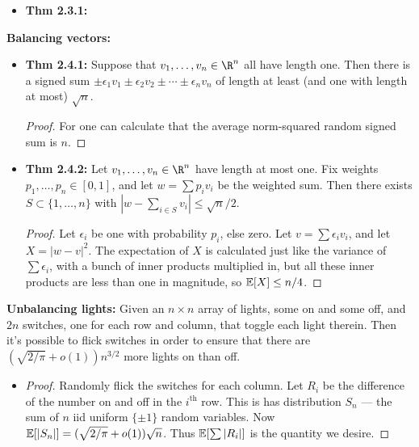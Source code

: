 \documentclass[11pt]{article}
\newenvironment{INT}[1][]{\begin{itemize}\small\item\textbf{#1}}{\end{itemize}}
\newcommand{\moreINT}[1][]{\item\textbf{#1}}
\begin{document}
\begin{chapter2}
\begin{itemise}
\begin{INT}[Thm 2.3.1:]
\end{INT}
\item \textbf{Balancing vectors:}
\begin{INT}[Thm 2.4.1:]
Suppose that $v_1,\ldots,v_n\in\R^n$ all have length one. Then there is a signed sum $\pm\epsilon_1 v_1\pm\epsilon_2v_2\pm\cdots\pm\epsilon_n v_n$ of length at least (and one with length at most) $\sqrt n$.
\begin{proof}
For one can calculate that the average norm-squared random signed sum is $n$.
\end{proof}
\moreINT[Thm 2.4.2:]
Let $v_1,\ldots,v_n\in\R^n$ have length at most one. Fix weights $p_1,\ldots,p_n\in[0,1]$, and let $w=\sum p_iv_i$ be the weighted sum. Then there exists $S\subset \{1,\ldots,n\}$ with $|w-\sum_{i\in S} v_i|\leq\sqrt n/2$.
\begin{proof}
Let $\epsilon_i$ be one with probability $p_i$, else zero. Let $v=\sum \epsilon_iv_i$, and let $X=|w-v|^2$. The expectation of $X$ is calculated just like the variance of $\sum\epsilon_i$, with a bunch of inner products multiplied in, but all these inner products are less than one in magnitude, so $\operatorname{\mathbb{E}}[X]\leq n/4$.
\end{proof}
\end{INT}
\item \textbf{Unbalancing lights:} Given an $n\times n$ array of lights, some on and some off, and $2n$ switches, one for each row and column, that toggle each light therein. Then it's possible to flick switches in order to ensure that there are $(\sqrt{2/\pi}+o(1))n^{3/2}$ more lights on than off.
\begin{INT}
\begin{proof}
Randomly flick the switches for each column. Let $R_i$ be the difference of the number on and off in the $i^\text{th}$ row. This is has distribution $S_n$ --- the sum of $n$ iid uniform $\{\pm1\}$ random variables. Now $\operatorname{\mathbb{E}}[|S_n|]=(\sqrt{2/\pi}+o(1))\sqrt n$. Thus $\operatorname{\mathbb{E}}[\sum|R_i|]$ is the quantity we desire.
\end{proof}
\end{INT}
\end{itemise}

\end{chapter2}
\end{document}
